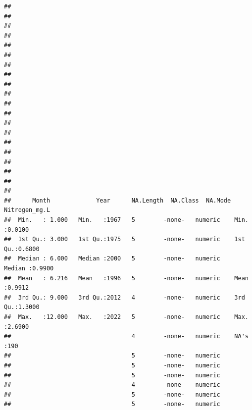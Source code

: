 \documentclass[
  12pt,
]{article}
\begin{document}
\begin{verbatim}
##                                                                       
##                                                                       
##                                                                       
##                                                                       
##                                                                       
##                                                                       
##                                                                       
##                                                                       
##                                                                       
##                                                                       
##                                                                       
##                                                                       
##                                                                       
##                                                                       
##                                                                       
##                                                                       
##                                                                       
##                                                                       
##                                                                       
##                                                                       
##      Month             Year      NA.Length  NA.Class  NA.Mode Nitrogen_mg.L   
##  Min.   : 1.000   Min.   :1967   5        -none-   numeric    Min.   :0.0100  
##  1st Qu.: 3.000   1st Qu.:1975   5        -none-   numeric    1st Qu.:0.6800  
##  Median : 6.000   Median :2000   5        -none-   numeric    Median :0.9900  
##  Mean   : 6.216   Mean   :1996   5        -none-   numeric    Mean   :0.9912  
##  3rd Qu.: 9.000   3rd Qu.:2012   4        -none-   numeric    3rd Qu.:1.3000  
##  Max.   :12.000   Max.   :2022   5        -none-   numeric    Max.   :2.6900  
##                                  4        -none-   numeric    NA's   :190     
##                                  5        -none-   numeric                    
##                                  5        -none-   numeric                    
##                                  5        -none-   numeric                    
##                                  4        -none-   numeric                    
##                                  5        -none-   numeric                    
##                                  5        -none-   numeric                    

\end{verbatim}
\end{document}
